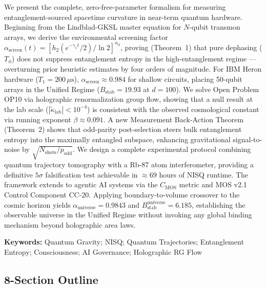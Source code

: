 \documentclass[11pt,letterpaper]{article}
\newcommand{\asc}{\alpha_{\mathrm{screen}}}
\newcommand{\htwo}{h_2}
\newcommand{\Bstab}{B_{\mathrm{stab}}}
\newcommand{\CMOS}{C_{\mathrm{MOS}}}
\newcommand{\nprt}{n_{\partial}}
\newcommand{\gamone}{\gamma_1}
\begin{document}
\begin{mdframed}
We present the complete, zero-free-parameter formalism for measuring entanglement-sourced spacetime curvature in near-term quantum hardware. Beginning from the Lindblad-GKSL master equation for $N$-qubit transmon arrays, we derive the environmental screening factor $\asc(t) = [\htwo(e^{-\gamone t}/2)/\ln 2]^{\nprt}$, proving (Theorem~1) that pure dephasing ($T_\phi$) does not suppress entanglement entropy in the high-entanglement regime --- overturning prior heuristic estimates by four orders of magnitude. For IBM Heron hardware ($T_1 = 200\,\mu\text{s}$), $\asc \approx 0.984$ for shallow circuits, placing 50-qubit arrays in the Unified Regime ($\Bstab = 19.93$ at $d = 100$). We solve Open Problem OP10 via holographic renormalization group flow, showing that a null result at the lab scale ($|\tilde{\kappa}_{\mathrm{lab}}| < 10^{-4}$) is consistent with the observed cosmological constant via running exponent $\beta \approx 0.091$. A new Measurement Back-Action Theorem (Theorem~2) shows that odd-parity post-selection steers bulk entanglement entropy into the maximally entangled subspace, enhancing gravitational signal-to-noise by $\sqrt{N_{\mathrm{shots}}/p_{\mathrm{odd}}}$. We design a complete experimental protocol combining quantum trajectory tomography with a Rb-87 atom interferometer, providing a definitive $5\sigma$ falsification test achievable in $\approx 69$ hours of NISQ runtime. The framework extends to agentic AI systems via the $\CMOS$ metric and MOS v2.1 Control Component CC-20. Applying boundary-to-volume crossover to the cosmic horizon yields $\alpha_{\mathrm{universe}} = 0.9843$ and $B_{\mathrm{stab}}^{\mathrm{universe}} = 6.185$, establishing the observable universe in the Unified Regime without invoking any global binding mechanism beyond holographic area laws.

\textbf{Keywords:} Quantum Gravity; NISQ; Quantum Trajectories; Entanglement Entropy; Consciousness; AI Governance; Holographic RG Flow
\end{mdframed}

\subsection{8-Section Outline}
\end{document}

